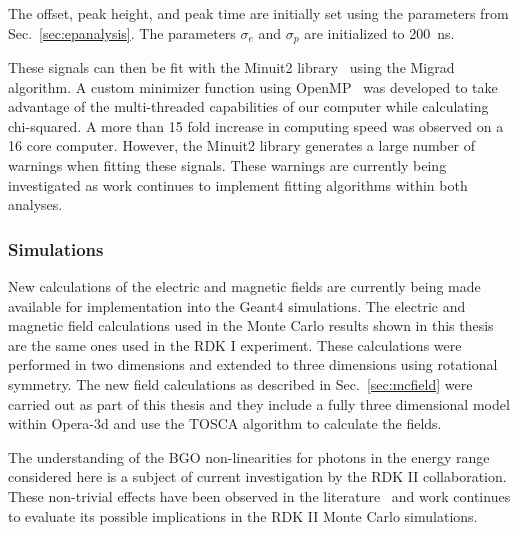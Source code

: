 \documentclass[oneside,12pt]{memoir}
\begin{document}
The offset, peak height, and peak time are initially set using the parameters from Sec.~\ref{sec:epanalysis}. The parameters $\sigma_e$ and $\sigma_p$ are initialized to 200~ns.\par
These signals can then be fit with the Minuit2 library~\cite{minuit2} using the Migrad algorithm. A custom minimizer function using OpenMP~\cite{openmp} was developed to take advantage of the multi-threaded capabilities of our computer while calculating chi-squared. A more than 15 fold increase in computing speed was observed on a 16 core computer. However, the Minuit2 library generates a large number of warnings when fitting these signals. These warnings are currently being investigated as work continues to implement fitting algorithms within both analyses.\par

\subsubsection{Simulations}
New calculations of the electric and magnetic fields are currently being made available for implementation into the Geant4 simulations. The electric and magnetic field calculations used in the Monte Carlo results shown in this thesis are the same ones used in the RDK I experiment. These calculations were performed in two dimensions and extended to three dimensions using rotational symmetry. The new field calculations as described in Sec.~\ref{sec:mcfield}  were carried out as part of this thesis and they include a fully three dimensional model within Opera-3d and use the TOSCA algorithm to calculate the fields.\par
The understanding of the BGO non-linearities for photons in the energy range considered here is a subject of current investigation by the RDK II collaboration. These non-trivial effects have been observed in the literature~\cite{Verdier11,Moszynski04,Khodyuk12} and work continues to evaluate its possible implications in the RDK II Monte Carlo simulations.\par
\end{document}
